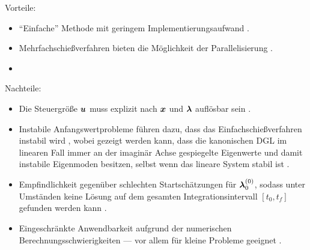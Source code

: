 \begin{multicols}{2}
	Vorteile:
	\begin{itemize}
		\item ``Einfache'' Methode mit geringem Implementierungsaufwand \cite{Ascher.1995c4}.
		\item Mehrfachschießverfahren bieten die Möglichkeit der Parallelisierung \cite{Betts.1998}.\vspace{\fill}
		\item[\vspace{\fill}]
	\end{itemize}
	
	\columnbreak
	
	Nachteile:
	\begin{itemize}
		\item Die Steuergröße $\boldsymbol{u}$ muss explizit nach $\boldsymbol{x}$ und $\boldsymbol{\lambda}$ auflösbar sein \cite{Papageorgiou.2012}.\vspace{\fill}
		\item Instabile Anfangswertprobleme führen dazu, dass das Einfachschießverfahren instabil wird \cite{Ascher.1995c4}, wobei gezeigt werden kann, dass die kanonischen \gls{DGL} im linearen Fall immer an der imaginär Achse gespiegelte Eigenwerte und damit instabile Eigenmoden besitzen, selbst wenn das lineare System stabil ist \cite{KnutGraichen.2012}. 
		\item Empfindlichkeit gegenüber schlechten Startschätzungen für $\boldsymbol{\lambda}_0^{(0)}$, sodass unter Umständen keine Lösung auf dem gesamten Integrationsintervall $[t_0, t_f]$ gefunden werden kann \cite{Ascher.1995c4}.
		\item Eingeschränkte Anwendbarkeit aufgrund der numerischen Berechnungsschwierigkeiten --- vor allem für kleine Probleme geeignet \cite{Papageorgiou.2012}.
	\end{itemize}
\end{multicols}

